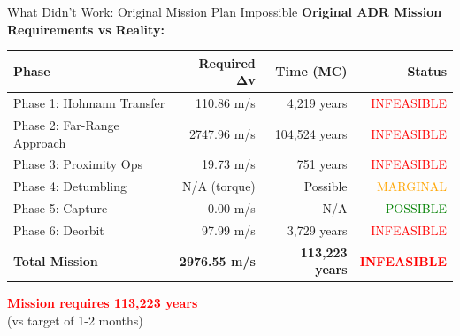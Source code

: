 \documentclass[aspectratio=169]{beamer}
\begin{document}
\begin{frame}{What Didn't Work: Original Mission Plan Impossible}
\textbf{Original ADR Mission Requirements vs Reality:}

\vspace{0.5em}
\begin{table}
\footnotesize
\begin{tabular}{lrrr}
\toprule
\textbf{Phase} & \textbf{Required Δv} & \textbf{Time (MC)} & \textbf{Status} \\
\midrule
Phase 1: Hohmann Transfer & 110.86 m/s & 4,219 years & \textcolor{red}{INFEASIBLE} \\
Phase 2: Far-Range Approach & 2747.96 m/s & 104,524 years & \textcolor{red}{INFEASIBLE} \\
Phase 3: Proximity Ops & 19.73 m/s & 751 years & \textcolor{red}{INFEASIBLE} \\
Phase 4: Detumbling & N/A (torque) & Possible & \textcolor{orange}{MARGINAL} \\
Phase 5: Capture & 0.00 m/s & N/A & \textcolor{green}{POSSIBLE} \\
Phase 6: Deorbit & 97.99 m/s & 3,729 years & \textcolor{red}{INFEASIBLE} \\
\midrule
\textbf{Total Mission} & \textbf{2976.55 m/s} & \textbf{113,223 years} & \textcolor{red}{\textbf{INFEASIBLE}} \\
\bottomrule
\end{tabular}
\end{table}

\vspace{1em}
\begin{center}
\textcolor{red}{\Large\textbf{Mission requires 113,223 years}}\\
\vspace{0.3em}
\normalsize (vs target of 1-2 months)
\end{center}
\end{frame}
\end{document}
